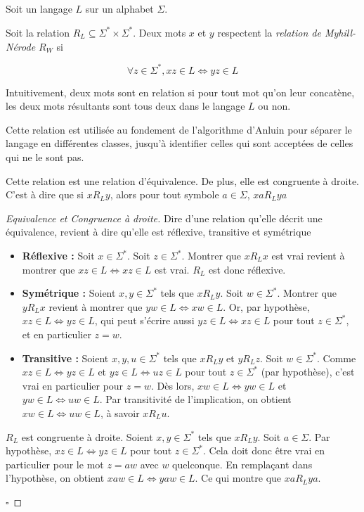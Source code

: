 \subsection{\rl}\label{angluin:rl}

Soit un langage $L$ sur un alphabet $\Sigma$.

Soit la relation $R_L\subseteq\Sigma^*\times\Sigma^*$. Deux mots $x$ et $y$ respectent la \emph{relation de Myhill-Nérode $R_W$} si

$$\forall z \in \Sigma^*, xz \in L \Leftrightarrow yz \in L$$

Intuitivement, deux mots sont en relation si pour tout mot qu'on leur concatène, les deux mots résultants sont tous deux dans le langage $L$ ou non.

Cette relation est utilisée au fondement de l'algorithme d'Anluin pour séparer le langage en différentes classes, jusqu'à identifier celles qui sont acceptées de celles qui ne le sont pas.

\begin{lemma}
	Cette relation est une relation d'équivalence. De plus, elle est congruente à droite. C'est à dire que si $xR_Ly$, alors pour tout symbole $a \in \Sigma$, $xaR_Lya$
\end{lemma}

\begin{proof}[Equivalence et Congruence à droite]
	Dire d'une relation qu'elle décrit une équivalence, revient à dire qu'elle est réflexive, transitive et symétrique
\begin{itemize}
		\item\textbf{Réflexive :} Soit $x \in \Sigma^*$. Soit $z \in \Sigma^*$. Montrer que $xR_Lx$ est vrai revient à montrer que $ xz \in L \Leftrightarrow xz \in L$ est vrai. $R_L$ est donc réflexive.
		\item \textbf{Symétrique :} Soient $x, y \in \Sigma^*$ tels que $xR_Ly$. Soit $w \in \Sigma^*$. Montrer que $yR_Lx$ revient à montrer que $ yw \in L \Leftrightarrow xw \in L$. Or, par hypothèse, $ xz \in L \Leftrightarrow yz \in L$, qui peut s'écrire aussi $ yz \in L \Leftrightarrow xz \in L$ pour tout $z \in \Sigma^*$, et en particulier $z=w$.
		\item \textbf{Transitive :} Soient $x,y,u \in \Sigma^*$ tels que $xR_Ly$ et $yR_Lz$. Soit $w \in \Sigma^*$. Comme $ xz \in L \Leftrightarrow yz \in L$ et $ yz \in L \Leftrightarrow uz \in L$ pour tout $z \in \Sigma^*$ (par hypothèse), c'est vrai en particulier pour $z=w$. Dès lors,  $ xw \in L \Leftrightarrow yw \in L$ et $ yw \in L \Leftrightarrow uw \in L$. Par transitivité de l'implication, on obtient $ xw \in L \Leftrightarrow uw \in L$, à savoir $xR_Lu$.
	\end{itemize}

	$R_L$ est congruente à droite. Soient $x,y \in \Sigma^*$ tels que $xR_Ly$. Soit $a \in \Sigma$. Par hypothèse, $ xz \in L \Leftrightarrow yz \in L$ pour tout $z \in \Sigma^*$. Cela doit donc être vrai en particulier pour le mot $z=aw$ avec $w$ quelconque. En remplaçant dans l'hypothèse, on obtient  $ xaw \in L \Leftrightarrow yaw \in L$. Ce qui montre que $xaR_Lya$.

\hfill$\square$
\end{proof}



